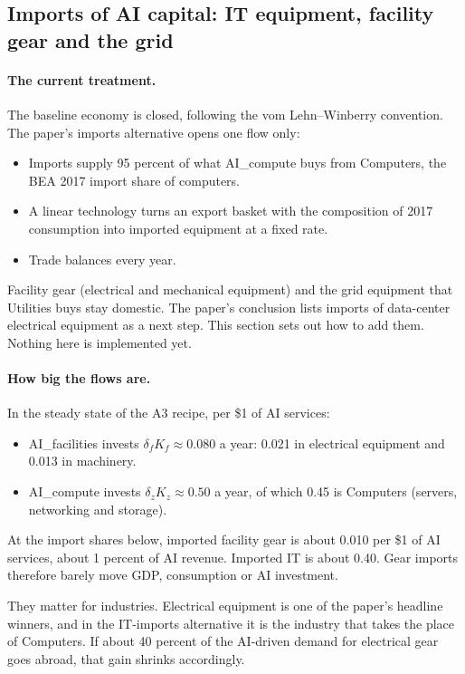 \subsection{Imports of AI capital: IT equipment, facility gear and the grid}\label{sec:rec:imports}

\paragraph{The current treatment.} The baseline economy is closed, following the vom
Lehn--Winberry convention. The paper's imports alternative opens one flow only:
\begin{itemize}
  \item Imports supply 95 percent of what AI\_compute buys from Computers, the BEA 2017 import
    share of computers.
  \item A linear technology turns an export basket with the composition of 2017 consumption into
    imported equipment at a fixed rate.
  \item Trade balances every year.
\end{itemize}
Facility gear (electrical and mechanical equipment) and the grid equipment that Utilities buys
stay domestic. The paper's conclusion lists imports of data-center electrical equipment as a next
step. This section sets out how to add them. Nothing here is implemented yet.

\paragraph{How big the flows are.} In the steady state of the A3 recipe, per \$1 of AI services:
\begin{itemize}
  \item AI\_facilities invests $\delta_fK_f\approx0.080$ a year: 0.021 in electrical equipment
    and 0.013 in machinery.
  \item AI\_compute invests $\delta_zK_z\approx0.50$ a year, of which 0.45 is Computers
    (servers, networking and storage).
\end{itemize}
At the import shares below, imported facility gear is about 0.010 per \$1 of AI services, about
1 percent of AI revenue. Imported IT is about 0.40. Gear imports therefore barely move GDP,
consumption or AI investment.

They matter for industries. Electrical equipment is one of the paper's headline winners, and in
the IT-imports alternative it is the industry that takes the place of Computers. If about 40
percent of the AI-driven demand for electrical gear goes abroad, that gain shrinks accordingly.

